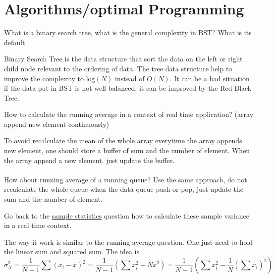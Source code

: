 \documentclass{exam}%
\newcommand*{\ANCOAALGO}{}%
\begin{document}
\ifdefined\ANCOAALGO
\newpage
\section{Algorithms/optimal Programming}
\renewcommand{\questionlabel}{Opt.~\thequestion ]}
\begin{questions}

\question What is a binary search tree, what is the general complexity in BST? What is its default
\begin{solution}[.2in]
Binary Search Tree is the data structure that sort the data on the left or right child node relevant to the ordering of data. The tree data structure help to improve the complexity to $\text{log}(N)$ instead of $O(N)$. It can be a bad situation if the data put in BST is not well balanced, it can be improved by the Red-Black Tree.
\end{solution}

\question How to calculate the running average in a context of real time application? (array append new element continuously)
\begin{solution}[.2in]
	To avoid recalculate the mean of the whole array everytime the array appends new element, one should store a buffer of sum and the number of element. When the array append a new element, just update the buffer.
	\paragraph{} How about running average of a running queue? Use the same approach, do not recalculate the whole queue when the data queue push or pop, just update the sum and the number of element.
\end{solution}

\question Go back to the  \hyperref[stat:sample_stat]{sample statistics} question how to calculate these sample variance in a real time context.
\begin{solution}[.2in]
The way it work is similar to the running average question. One just need to hold the linear sum and squared sum. The idea is 
\[
\bar{\sigma}_{N}^2 
=
\frac{1}{N-1} \sum(x_i - \bar{x})^2
=
\frac{1}{N-1}(\sum x_i^2 - N\bar{x}^2)
=
\frac{1}{N-1}(\sum x_i^2 - \frac{1}{N}(\sum x_i)^2)
\]
\end{solution}


\end{questions}
\end{document}
